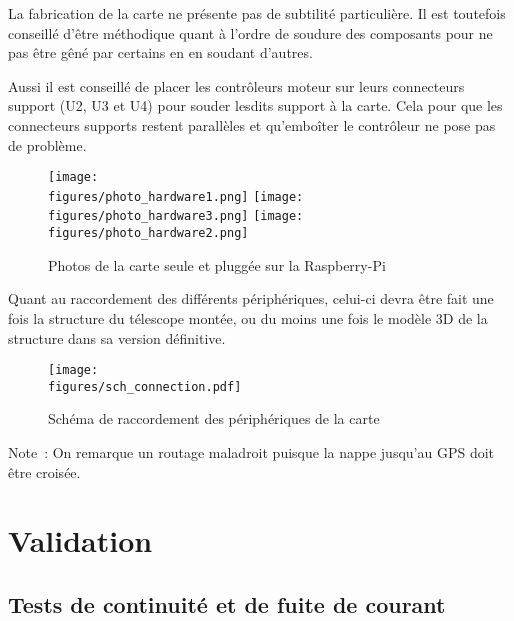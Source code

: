 La fabrication de la carte ne présente pas de subtilité particulière. Il est toutefois conseillé d'être méthodique quant à l'ordre de soudure des composants pour ne pas être gêné par certains en en soudant d'autres.

Aussi il est conseillé de placer les contrôleurs moteur sur leurs connecteurs support (U2, U3 et U4) pour souder lesdits support à la carte. Cela pour que les connecteurs supports restent parallèles et qu'emboîter le contrôleur ne pose pas de problème.

\begin{figure}[H]
    \centering
	\texttt{[image: \\figures/photo\_hardware1.png]}
	\texttt{[image: \\figures/photo\_hardware3.png]}
	\texttt{[image: \\figures/photo\_hardware2.png]}
    \decoRule
    \caption[
    Photos de la carte seule et pluggée sur la Raspberry-Pi]{
    Photos de la carte seule et pluggée sur la Raspberry-Pi}
    \label{fig:Photos de la carte seule et pluggée sur la Raspberry-Pi}
	\end{figure}

\vspace{1cm}

Quant au raccordement des différents périphériques, celui-ci devra être fait une fois la structure du télescope montée, ou du moins une fois le modèle 3D de la structure dans sa version définitive.

\begin{figure}[H]
    \centering
	\texttt{[image: \\figures/sch\_connection.pdf]}
    \decoRule
    \caption[
    Schéma de raccordement des périphériques de la carte]{
    Schéma de raccordement des périphériques de la carte}
    \label{fig:Schéma de raccordement des périphériques de la carte}
	\end{figure}


\vspace{1cm}

Note~: On remarque un routage maladroit puisque la nappe jusqu'au GPS doit être croisée.

\section{Validation}

\subsection{Tests de continuité et de fuite de courant}

